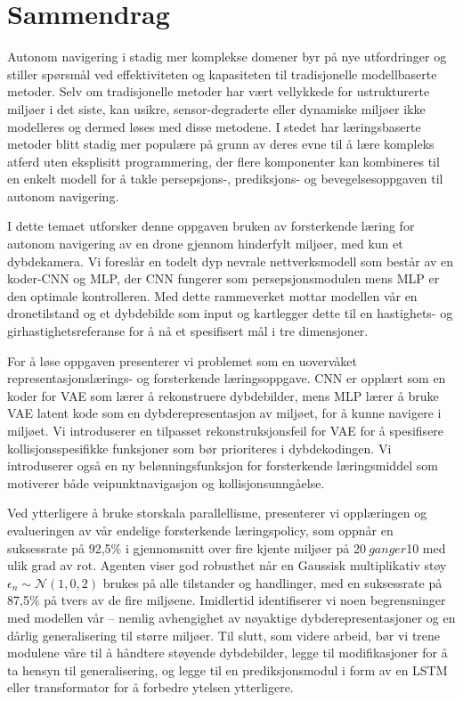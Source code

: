 \chapter*{Sammendrag}

Autonom navigering i stadig mer komplekse domener byr på nye utfordringer og stiller spørsmål ved effektiviteten og kapasiteten til tradisjonelle modellbaserte metoder. Selv om tradisjonelle metoder har vært vellykkede for ustrukturerte miljøer i det siste, kan usikre, sensor-degraderte eller dynamiske miljøer ikke modelleres og dermed løses med disse metodene. I stedet har læringsbaserte metoder blitt stadig mer populære på grunn av deres evne til å lære kompleks atferd uten eksplisitt programmering, der flere komponenter kan kombineres til en enkelt modell for å takle persepsjons-, prediksjons- og bevegelsesoppgaven til autonom navigering.

I dette temaet utforsker denne oppgaven bruken av forsterkende læring for autonom navigering av en drone gjennom hinderfylt miljøer, med kun et dybdekamera. Vi foreslår en todelt dyp nevrale nettverksmodell som består av en koder-CNN og MLP, der CNN fungerer som persepsjonsmodulen mens MLP er den optimale kontrolleren. Med dette rammeverket mottar modellen vår en dronetilstand og et dybdebilde som input og kartlegger dette til en hastighets- og girhastighetsreferanse for å nå et spesifisert mål i tre dimensjoner.

For å løse oppgaven presenterer vi problemet som en uovervåket representasjonslærings- og forsterkende læringsoppgave. CNN er opplært som en koder for VAE som lærer å rekonstruere dybdebilder, mens MLP lærer å bruke VAE latent kode som en dybderepresentasjon av miljøet, for å kunne navigere i miljøet. Vi introduserer en tilpasset rekonstruksjonsfeil for VAE for å spesifisere kollisjonsspesifikke funksjoner som bør prioriteres i dybdekodingen. Vi introduserer også en ny belønningsfunksjon for forsterkende læringsmiddel som motiverer både veipunktnavigasjon og kollisjonsunngåelse.

Ved ytterligere å bruke storskala parallellisme, presenterer vi opplæringen og evalueringen av vår endelige forsterkende læringspolicy, som oppnår en suksessrate på 92,5\% i gjennomsnitt over fire kjente miljøer på 20$\ ganger $10 med ulik grad av rot. Agenten viser god robusthet når en Gaussisk multiplikativ støy $\epsilon_n \sim \mathcal{N}(1, 0,2)$ brukes på alle tilstander og handlinger, med en suksessrate på 87,5\% på tvers av de fire miljøene. Imidlertid identifiserer vi noen begrensninger med modellen vår -- nemlig avhengighet av nøyaktige dybderepresentasjoner og en dårlig generalisering til større miljøer. Til slutt, som videre arbeid, bør vi trene modulene våre til å håndtere støyende dybdebilder, legge til modifikasjoner for å ta hensyn til generalisering, og legge til en prediksjonsmodul i form av en LSTM eller transformator for å forbedre ytelsen ytterligere.